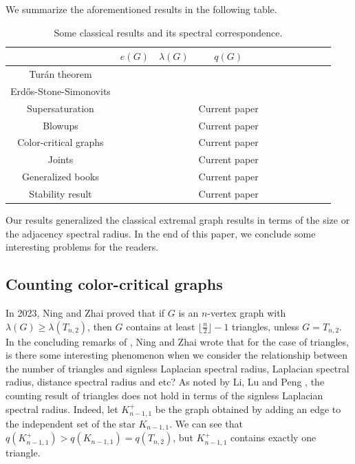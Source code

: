 \documentclass[11pt,a4paper]{article}
\theoremstyle{plain}
\theoremstyle{definition}
\begin{document}
We summarize the aforementioned results in the following table. 

\begin{table}[H]
\centering
\begin{tabular}{ccccccccccc}
\toprule
  & $e(G)$ & $\lambda (G)$ & $q(G)$ \\
\midrule
Tur\'{a}n theorem & \cite{Turan41} 
 & \cite{Gui1996,Niki2007laa2} &  \cite{HJZ2013}  \\
 Erd\H{o}s-Stone-Simonovits & \cite{ES1946,ES1966}  & \cite{Gui1996,ESB2009} & \cite{ZLS2025}  \\ 
 Supersaturation & \cite{ES1983-super}  
 &  \cite{BN2007jctb} &  Current paper \\
 Blowups & \cite{BE1973} & \cite{ESB2009} & Current paper \\ 
 Color-critical graphs & \cite{S1968}  & \cite{N2009} & Current paper \\ 
 Joints & \cite{Erd1969,BN2008} & \cite{N2009,LLZ2024-book-4-cycle} & Current paper \\  
 Generalized books & \cite{LLZ2024-book-4-cycle}  
 & \cite{LLZ2024-book-4-cycle} & Current paper \\  
  Stability result & \cite{Erd1966Sta1,Erd1966Sta2,S1968} &  \cite{Niki2009jgt} & Current paper \\ 
\bottomrule 
\end{tabular}
\caption{Some classical results and its spectral correspondence.}
 \label{tab-SSSR}
\end{table}



Our results generalized the classical extremal graph results in terms of the size or the adjacency spectral radius. 
In the end of this paper, we conclude some interesting problems for the readers. 




\subsection{Counting color-critical graphs}

In 2023, Ning and Zhai \cite{NZ2021} proved that if $G$ is an $n$-vertex graph with $\lambda (G)\ge \lambda (T_{n,2})$, then $G$ contains at least $\lfloor \frac{n}{2}\rfloor -1$ triangles, unless $G=T_{n,2}$. 
In the concluding remarks of \cite{NZ2021}, Ning and Zhai wrote that
for the case of triangles, is there some interesting
phenomenon when we consider the relationship between the number of triangles
and signless Laplacian spectral radius, Laplacian spectral radius, distance spectral
radius and etc? 
As noted by Li, Lu and Peng \cite[Sec. 5]{LLP2024-AAM}, 
the counting result of triangles does not hold 
in terms of the signless Laplacian spectral radius. 
Indeed, let $K_{n-1,1}^+$ be the graph obtained by adding an edge to the independent set of the star $K_{n-1,1}$. 
We can see that $q(K_{n-1,1}^+) > q(K_{n-1,1}) =q(T_{n,2})$, but $K_{n-1,1}^+$ contains exactly one triangle. 
\end{document}
